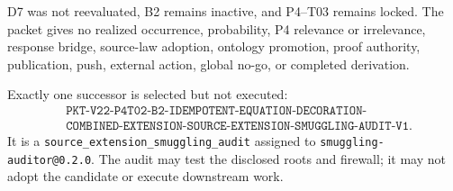 \documentclass[11pt]{article}
\begin{document}
D7 was not reevaluated, B2 remains inactive, and P4--T03 remains locked. The
packet gives no realized occurrence, probability, P4 relevance or
irrelevance, response bridge, source-law adoption, ontology promotion, proof
authority, publication, push, external action, global no-go, or completed
derivation.

Exactly one successor is selected but not executed:
\[
\begin{split}
&\texttt{PKT-V22-P4T02-B2-IDEMPOTENT-EQUATION-DECORATION-}\\
&\texttt{COMBINED-EXTENSION-SOURCE-EXTENSION-SMUGGLING-AUDIT-V1}.
\end{split}
\]
It is a \texttt{source\_extension\_smuggling\_audit} assigned to
\texttt{smuggling-auditor@0.2.0}. The audit may test the disclosed roots and
firewall; it may not adopt the candidate or execute downstream work.
\end{document}
